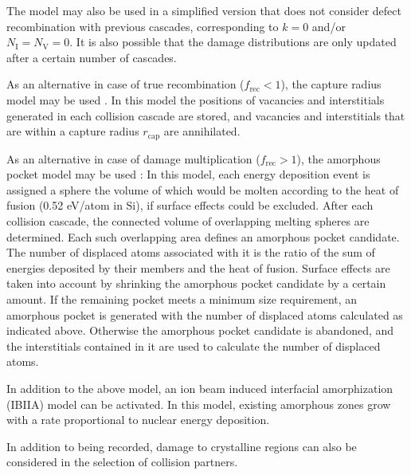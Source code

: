 The model may also be used in a simplified version that does not consider
defect recombination with previous cascades, corresponding to $k=0$ and/or
$N_\mathrm{I}=N_\mathrm{V}=0$. It is also possible that the damage 
distributions are only updated after a certain number of cascades. 

As an alternative in case of true recombination ($f_\mathrm{rec} < 1$), the
capture radius model may be used \cite{simionescu_comparison_1995}. In this
model the positions of vacancies and interstitials generated in each collision
cascade are stored, and vacancies and interstitials that are within a capture
radius $r_\mathrm{cap}$ are annihilated. 

As an alternative in case of damage multiplication ($f_\mathrm{rec} > 1$), the
amorphous pocket model may be used \cite{hobler_amorphous_2003}: In this
model, each energy deposition event is assigned a sphere the volume of which
would be molten according to the heat of fusion (0.52 eV/atom in Si), if surface
effects could be excluded. After each collision cascade, the connected volume
of overlapping melting spheres are determined. Each such overlapping area deﬁnes
an amorphous pocket candidate. The number of displaced atoms associated with it 
is the ratio of the sum of energies deposited by their members and the heat
of fusion. Surface effects are taken into account by shrinking the amorphous 
pocket candidate by a certain amount. If the remaining pocket meets a minimum 
size requirement, an amorphous pocket is generated with the number of displaced 
atoms calculated as indicated above. Otherwise the amorphous pocket candidate is
abandoned, and the interstitials contained in it are used to calculate the
number of displaced atoms. 

In addition to the above model, an ion beam induced interfacial amorphization
(IBIIA) model \cite{I9766} can be activated. In this model, existing amorphous
zones grow with a rate proportional to nuclear energy deposition.

In addition to being recorded, damage to crystalline regions can also be
considered in the selection of collision partners.


